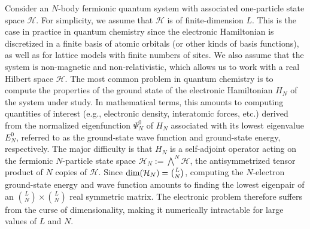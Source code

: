 \documentclass{article}
\newcommand{\1}{{\mathds 1}}
\begin{document}
Consider an $N$-body fermionic quantum system with associated one-particle state space $\mathcal{H}$. For simplicity, we assume that $\mathcal H$ is of finite-dimension $L$. This is the case in practice in quantum chemistry since the electronic Hamiltonian is discretized in a finite basis of atomic orbitals (or other kinds of basis functions), as well as for lattice models with finite numbers of sites. We also assume that the system is non-magnetic and non-relativistic, which allows us to work with a {\rm real} Hilbert space $\mathcal H$. The most common problem in quantum chemistry is to compute the properties of the ground state of the electronic Hamiltonian $H_N$ of the system under study. In mathematical terms, this amounts to computing quantities of interest (e.g., electronic density, interatomic forces, etc.) derived from the normalized eigenfunction $\Psi_N^0$ of $H_N$ associated with its lowest eigenvalue $E_N^0$, referred to as the ground-state wave function and ground-state energy, respectively. 
The major difficulty is that $H_N$ is a self-adjoint operator acting on the fermionic $N$-particle state space $\mathcal H_N:=\bigwedge^N \mathcal H$, the antisymmetrized tensor product of $N$ copies of $\mathcal H$. Since ${\rm dim}(\mathcal H_N) = {L \choose N}$, computing the $N$-electron ground-state energy and wave function amounts to finding the lowest eigenpair of an ${L \choose N} \times {L \choose N}$ real symmetric matrix. The electronic problem therefore suffers from the curse of dimensionality, making it numerically intractable for large values of $L$ and $N$.

\medskip
\end{document}

